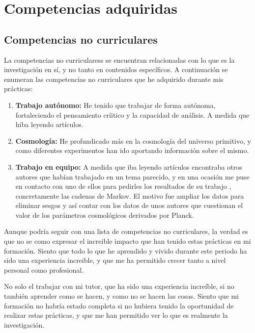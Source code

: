 \documentclass[12pt, a4paper]{article}
\theoremstyle{definition}
\begin{document}
\section{Competencias adquiridas}
\subsection{Competencias no curriculares}


La competencias no curricularess se encuentran relacionadas con lo que es la investigación en sí, y no tanto en contenidos específicos. A continuación se enumeran las competencias no curriculares que he adquirido durante mis prácticas:

\begin{enumerate}
  \item \textbf{Trabajo autónomo:} He tenido que trabajar de forma autónoma, fortaleciendo el pensamiento críitico y la capacidad de análisis. A medida que hiba leyendo artículos.
  \item \textbf{Cosmología:} He profundicado más en la cosmología del universo primitivo, y como diferentes experimentos han ido aportando información sobre el mismo.
  \item \textbf{Trabajo en equipo:} A medida que iba leyendo artículos encontraba otros autores que habían trabajado en un tema parecido, y en una ocasión me puse en contacto con uno de ellos para pedirles los resultados de su trabajo \autocite{Forconi_2025}, concretamente las cadenas de Markov. El motivo fue ampliar los datos para eliminar sesgos y así contar con los datos de unos autores que cuestionan el valor de los parámetros cosmológicos derivados por Planck.

\end{enumerate}

Aunque podría seguir con una lista de competencias no curriculares, la verdad es que no se como expresar el increible impacto que han tenido estas prácticas en mi formación. Siento que todo lo que he aprendido y vivido durante este periodo ha sido una experiencia increible, y que me ha permitido crecer tanto a nivel personal como profesional.

No solo el trabajar con mi tutor, que ha sido una experiencia increíble, si no también aprender como se hacen, y como no se hacen las cosas. Siento que mi formación no habría estado completa si no hubiera tenido la oportunidad de realizar estas prácticas, y que me han permitido ver lo que es realmente la investigación.
\end{document}
